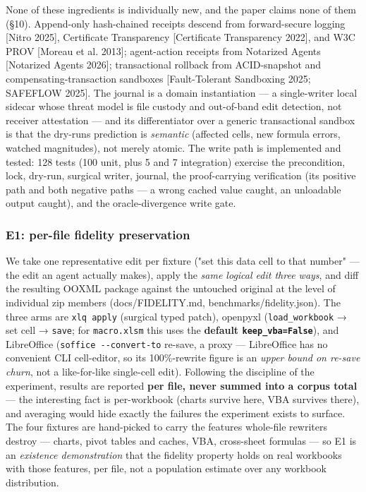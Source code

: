 \documentclass[
]{article}
\newcounter{none} %
\begin{document}
None of these ingredients is individually new, and the paper claims none
of them (§10). Append-only hash-chained receipts descend from
forward-secure logging {[}Nitro 2025{]}, Certificate Transparency
{[}Certificate Transparency 2022{]}, and W3C PROV {[}Moreau et al.
2013{]}; agent-action receipts from Notarized Agents {[}Notarized Agents
2026{]}; transactional rollback from ACID-snapshot and
compensating-transaction sandboxes {[}Fault-Tolerant Sandboxing 2025;
SAFEFLOW 2025{]}. The journal is a domain instantiation --- a
single-writer local sidecar whose threat model is file custody and
out-of-band edit detection, not receiver attestation --- and its
differentiator over a generic transactional sandbox is that the
dry-run\textquotesingle s prediction is \emph{semantic} (affected cells,
new formula errors, watched magnitudes), not merely atomic. The write
path is implemented and tested: 128 tests (100 unit, plus 5 and 7
integration) exercise the precondition, lock, dry-run, surgical writer,
journal, the proof-carrying verification (its positive path and both
negative paths --- a wrong cached value caught, an unloadable output
caught), and the oracle-divergence write gate.

\subsubsection{E1: per-file fidelity
preservation}\label{e1-per-file-fidelity-preservation}

We take one representative edit per fixture ("set this data cell to that
number" --- the edit an agent actually makes), apply the \emph{same
logical edit three ways}, and diff the resulting OOXML package against
the untouched original at the level of individual zip members
(docs/FIDELITY.md, benchmarks/fidelity.json). The three arms are
\texttt{xlq\ apply} (surgical typed patch), openpyxl
(\texttt{load\_workbook} → set cell → \texttt{save}; for
\texttt{macro.xlsm} this uses the \textbf{default
\texttt{keep\_vba=False}}), and LibreOffice
(\texttt{soffice\ -\/-convert-to} re-save, a proxy --- LibreOffice has
no convenient CLI cell-editor, so its 100\%-rewrite figure is an
\emph{upper bound on re-save churn}, not a like-for-like single-cell
edit). Following the discipline of the experiment, results are reported
\textbf{per file, never summed into a corpus total} --- the interesting
fact is per-workbook (charts survive here, VBA survives there), and
averaging would hide exactly the failures the experiment exists to
surface. The four fixtures are hand-picked to carry the features
whole-file rewriters destroy --- charts, pivot tables and caches, VBA,
cross-sheet formulas --- so E1 is an \emph{existence demonstration} that
the fidelity property holds on real workbooks with those features, per
file, not a population estimate over any workbook distribution.
\end{document}
